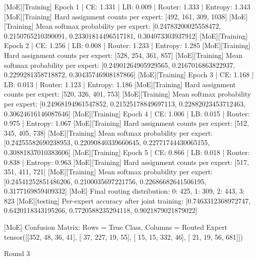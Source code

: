 [MoE][Training] Epoch 1 | CE: 1.331 | LB: 0.009 | Router: 1.333 | Entropy: 1.343
[MoE][Training] Hard assignment counts per expert: [492, 161, 309, 1038]
[MoE][Training] Mean softmax probability per expert: [0.24783200025558472, 0.2150765210390091, 0.23301814496517181, 0.304073303937912]
[MoE][Training] Epoch 2 | CE: 1.256 | LB: 0.008 | Router: 1.233 | Entropy: 1.285
[MoE][Training] Hard assignment counts per expert: [528, 254, 361, 857]
[MoE][Training] Mean softmax probability per expert: [0.24901264905929565, 0.2167016863822937, 0.2299281358718872, 0.30435746908187866]
[MoE][Training] Epoch 3 | CE: 1.168 | LB: 0.013 | Router: 1.123 | Entropy: 1.186
[MoE][Training] Hard assignment counts per expert: [520, 326, 401, 753]
[MoE][Training] Mean softmax probability per expert: [0.24968194961547852, 0.21525178849697113, 0.22882023453712463, 0.30624616146087646]
[MoE][Training] Epoch 4 | CE: 1.006 | LB: 0.015 | Router: 0.975 | Entropy: 1.067
[MoE][Training] Hard assignment counts per expert: [512, 345, 405, 738]
[MoE][Training] Mean softmax probability per expert: [0.24255582690238953, 0.22090840339660645, 0.22771744430065155, 0.30881837010383606]
[MoE][Training] Epoch 5 | CE: 0.866 | LB: 0.018 | Router: 0.838 | Entropy: 0.963
[MoE][Training] Hard assignment counts per expert: [517, 351, 411, 721]
[MoE][Training] Mean softmax probability per expert: [0.24541252851486206, 0.2100035697221756, 0.22686682641506195, 0.3177169859409332]
[MoE] Final routing distribution: {0: 425, 1: 309, 2: 443, 3: 823}
[MoE][testing] Per-expert accuracy after joint training: [0.7463312368972747, 0.6420118343195266, 0.7720588235294118, 0.9021879021879022]

[MoE] Confusion Matrix: Rows = True Class, Columns = Routed Expert
tensor([[352,  48,  36,  41],
[ 37, 227,  19,  55],
[ 15,  15, 332,  46],
[ 21,  19,  56, 681]])

Round 3

